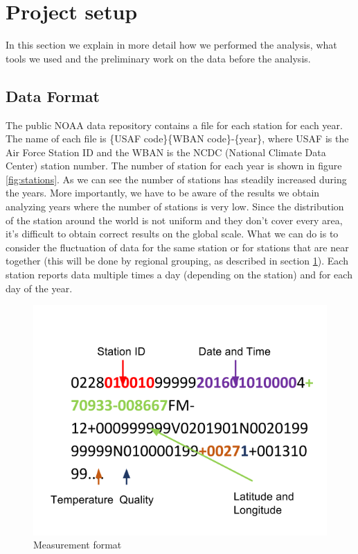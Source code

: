 \documentclass{vldb}
\begin{document}
\FloatBarrier

\section{Project setup}
\label{sec:pro}
In this section we explain in more detail how we performed the analysis, what tools we used and the preliminary work on the data before the analysis.

\subsection{Data Format}
The public NOAA data repository contains a file for each station for each year. The name of each file is \{USAF code\}\-\{WBAN code\}-\{year\}, where USAF is the Air Force Station ID and the WBAN is the NCDC (National Climate Data Center) station number. The number of station for each year is shown in figure \ref{fig:stations}. As we can see the number of stations has steadily increased during the years. More importantly, we have to be aware of the results we obtain analyzing years where the number of stations is very low. Since the distribution of the station around the world is not uniform and they don't cover every area, it's difficult to obtain correct results on the global scale. What we can do is to consider the fluctuation of data for the same station or for stations that are near together (this will be done by regional grouping, as described in section \ref{sec:pro}). Each station reports data multiple times a day (depending on the station) and for each day of the year. \\

\begin{figure}[tbh]
\includegraphics[width=1\linewidth]{data}
\caption{Measurement format}
\label{fig:data}
\end{figure}
\end{document}
